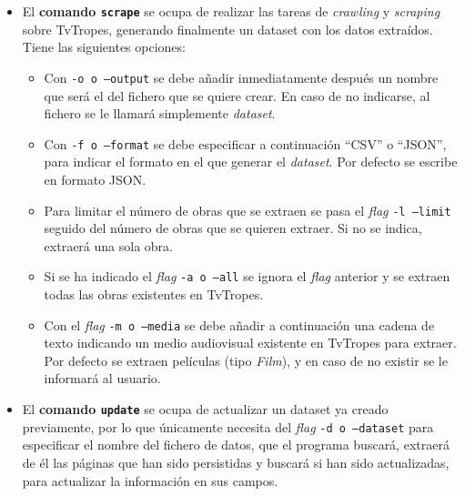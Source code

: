 \begin{itemize}
    \item El \textbf{comando \texttt{scrape}} se ocupa de realizar las tareas de
    \textit{crawling} y \textit{scraping} sobre TvTropes, generando finalmente
    un dataset con los datos extraídos. Tiene las siguientes opciones:
    \begin{itemize}
        \item Con \texttt{-o o --output} se debe añadir inmediatamente después
        un nombre que será el del fichero que se quiere crear. En caso de no
        indicarse, al fichero se le llamará simplemente \textit{dataset}.
        \item Con \texttt{-f o --format} se debe especificar a continuación
        ``CSV'' o ``JSON'', para indicar el formato en el que generar el
        \textit{dataset}. Por defecto se escribe en formato JSON.
        \item Para limitar el número de obras que se extraen se pasa el
        \textit{flag} \texttt{-l --limit} seguido del número de obras que se
        quieren extraer. Si no se indica, extraerá una sola obra.
        \item Si se ha indicado el \textit{flag} \texttt{-a o --all} se ignora
        el \textit{flag} anterior y se extraen todas las obras existentes en
        TvTropes.
        \item Con el \textit{flag} \texttt{-m o --media} se debe añadir a
        continuación una cadena de texto indicando un medio audiovisual
        existente en TvTropes para extraer. Por defecto se extraen películas
        (tipo \textit{Film}), y en caso de no existir se le informará al
        usuario.
    \end{itemize}
    \item El \textbf{comando \texttt{update}} se ocupa de actualizar un dataset
    ya creado previamente, por lo que únicamente necesita del \textit{flag}
    \texttt{-d o --dataset} para especificar el nombre del fichero de datos, que
    el programa buscará, extraerá de él las páginas que han sido persistidas y
    buscará si han sido actualizadas, para actualizar la información en sus
    campos.
\end{itemize}


